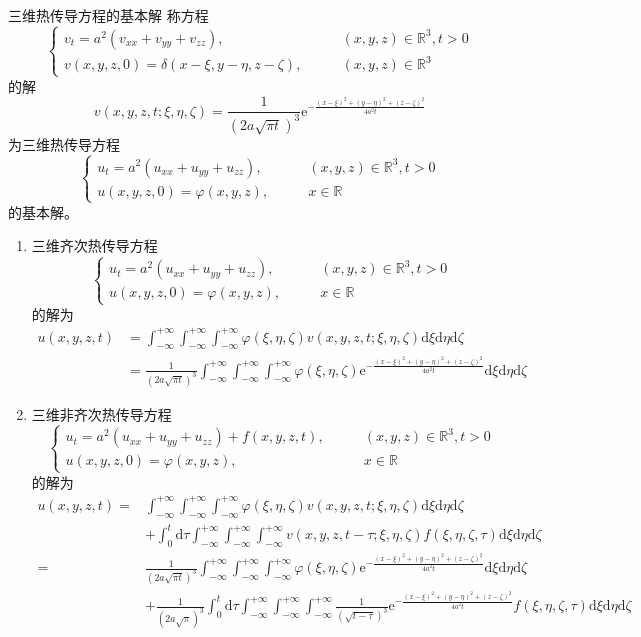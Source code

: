 \documentclass[lang = cn, scheme = chinese, thmcnt = section]{elegantbook}
\newcommand{\R}{\mathbb{R}}            %
\newcommand{\dd}{\mathrm{d}}           %
\newcommand{\ee}[1]{\mathrm{e}^{#1}}   %
\begin{document}
\begin{theorem}{三维热传导方程的基本解}
	称方程%
	$$
	\begin{cases}
		v_t=a^2(v_{xx}+v_{yy}+v_{zz}),\qquad & (x,y,z)\in\R^3,t>0\\
		v(x,y,z,0)=\delta(x-\xi,y-\eta,z-\zeta),\qquad & (x,y,z)\in\R^3
	\end{cases}
	$$
	的解%
	$$
	v(x,y,z,t;\xi,\eta,\zeta)=\frac{1}{(2a\sqrt{\pi t})^3}\ee{-\frac{(x-\xi)^2+(y-\eta)^2+(z-\zeta)^2}{4a^2t}}
	$$
	为三维热传导方程
	$$
	\begin{cases}
		u_t=a^2(u_{xx}+u_{yy}+u_{zz}),\qquad & (x,y,z)\in\R^3,t>0\\
		u(x,y,z,0)=\varphi(x,y,z),\qquad & x\in\R
	\end{cases}
	$$
	的基本解。
	\begin{enumerate}
		\item 三维齐次热传导方程
		$$
		\begin{cases}
			u_t=a^2(u_{xx}+u_{yy}+u_{zz}),\qquad & (x,y,z)\in\R^3,t>0\\
			u(x,y,z,0)=\varphi(x,y,z),\qquad & x\in\R
		\end{cases}
		$$
		的解为
		\begin{align*}
			u(x,y,z,t)
			& = \int_{-\infty}^{+\infty}\int_{-\infty}^{+\infty}\int_{-\infty}^{+\infty}\varphi(\xi,\eta,\zeta)v(x,y,z,t;\xi,\eta,\zeta)\dd\xi\dd\eta\dd\zeta\\
			& = \frac{1}{(2a\sqrt{\pi t})^3}\int_{-\infty}^{+\infty}\int_{-\infty}^{+\infty}\int_{-\infty}^{+\infty}\varphi(\xi,\eta,\zeta)\ee{-\frac{(x-\xi)^2+(y-\eta)^2+(z-\zeta)^2}{4a^2t}}\dd\xi\dd\eta\dd\zeta
		\end{align*}
		\item 三维非齐次热传导方程
		$$
		\begin{cases}
			u_t=a^2(u_{xx}+u_{yy}+u_{zz})+f(x,y,z,t),\qquad & (x,y,z)\in\R^3,t>0\\
			u(x,y,z,0)=\varphi(x,y,z),\qquad & x\in\R
		\end{cases}
		$$
		的解为
		\begin{align*}
			u(x,y,z,t)
			= &  \int_{-\infty}^{+\infty}\int_{-\infty}^{+\infty}\int_{-\infty}^{+\infty}\varphi(\xi,\eta,\zeta)v(x,y,z,t;\xi,\eta,\zeta)\dd\xi\dd\eta\dd\zeta\\
			& +  \int_{0}^{t}\dd\tau\int_{-\infty}^{+\infty}\int_{-\infty}^{+\infty}\int_{-\infty}^{+\infty}v(x,y,z,t-\tau;\xi,\eta,\zeta)f(\xi,\eta,\zeta,\tau)\dd\xi\dd\eta\dd\zeta\\
			= & \frac{1}{(2a\sqrt{\pi t})^3}\int_{-\infty}^{+\infty}\int_{-\infty}^{+\infty}\int_{-\infty}^{+\infty}\varphi(\xi,\eta,\zeta)\ee{-\frac{(x-\xi)^2+(y-\eta)^2+(z-\zeta)^2}{4a^2t}}\dd\xi\dd\eta\dd\zeta\\
			& + \frac{1}{(2a\sqrt{\pi })^3}\int_{0}^{t}\dd\tau\int_{-\infty}^{+\infty}\int_{-\infty}^{+\infty}\int_{-\infty}^{+\infty}\frac{1}{(\sqrt{ t-\tau})^3}\ee{-\frac{(x-\xi)^2+(y-\eta)^2+(z-\zeta)^2}{4a^2t}}f(\xi,\eta,\zeta,\tau)\dd\xi\dd\eta\dd\zeta
		\end{align*}
	\end{enumerate}
\end{theorem}
\end{document}
